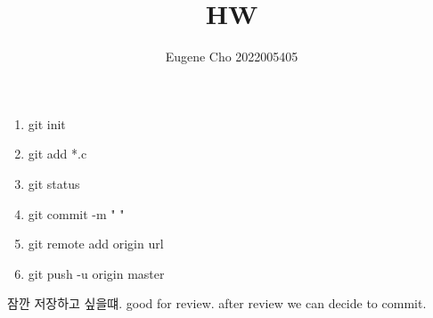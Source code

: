 \documentclass[a4paper]{article}
\author{Eugene Cho 2022005405}
\title{HW}
\date{}
\begin{document}
\maketitle
    \begin{enumerate}
        \item git init
        \item git add *.c
        \item git status
        \item git commit -m " "
        \item git remote add origin {url}
        \item git push -u origin master
    \end{enumerate}
잠깐 저장하고 싶을떄. good for review. after review we can decide to commit.
\end{document}

